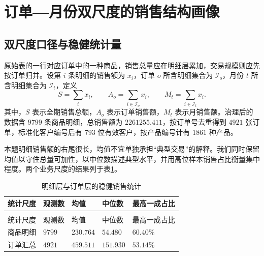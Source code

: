 \section{订单—月份双尺度的销售结构画像}
\label{sec:robust-profile}

\subsection{双尺度口径与稳健统计量}

原始表的一行对应订单中的一种商品，销售总量应在明细层累加，交易规模则应先按订单归并。设第 $i$ 条明细的销售额为 $x_i$，订单 $o$ 所含明细集合为 $\mathcal I_o$，月份 $t$ 所含明细集合为 $\mathcal I_t$，定义
\begin{equation}
S=\sum_i x_i,\qquad A_o=\sum_{i\in\mathcal I_o}x_i,\qquad M_t=\sum_{i\in\mathcal I_t}x_i .
\label{eq:q1-scales}
\end{equation}
其中，$S$ 表示全期销售总额，$A_o$ 表示订单销售额，$M_t$ 表示月销售额。治理后的数据含 $9799$ 条商品明细，总销售额为 $2261255.411$，按订单号去重得到 $4921$ 张订单，标准化客户编号后有 $793$ 位有效客户，按产品编号计有 $1861$ 种产品。%

本题明细销售额的右尾很长，均值不宜单独承担“典型交易”的解释。我们同时保留均值以守住总量可加性，以中位数描述典型水平，并用高位样本销售占比衡量集中程度\cite{tukey1977eda}。两个业务尺度的结果列于表\ref{tab:q1-robust-stat}。

\begin{longtable}{>{\centering\arraybackslash}p{}>{\centering\arraybackslash}p{}>{\centering\arraybackslash}p{}>{\centering\arraybackslash}p{}>{\centering\arraybackslash}p{}}
\caption{明细层与订单层的稳健销售统计}\label{tab:q1-robust-stat}\\
\toprule
统计尺度 & 观测数 & 均值 & 中位数 & 最高一成占比 \\
\midrule
\endfirsthead
\multicolumn{5}{c}{续表~\thetable}\\
\toprule
统计尺度 & 观测数 & 均值 & 中位数 & 最高一成占比 \\
\midrule
\endhead
\bottomrule
\endfoot
商品明细 & $9799$ & $230.764$ & $54.480$ & $60.40\%$ \\ %
订单汇总 & $4921$ & $459.511$ & $151.930$ & $53.14\%$ \\ %
\end{longtable}

